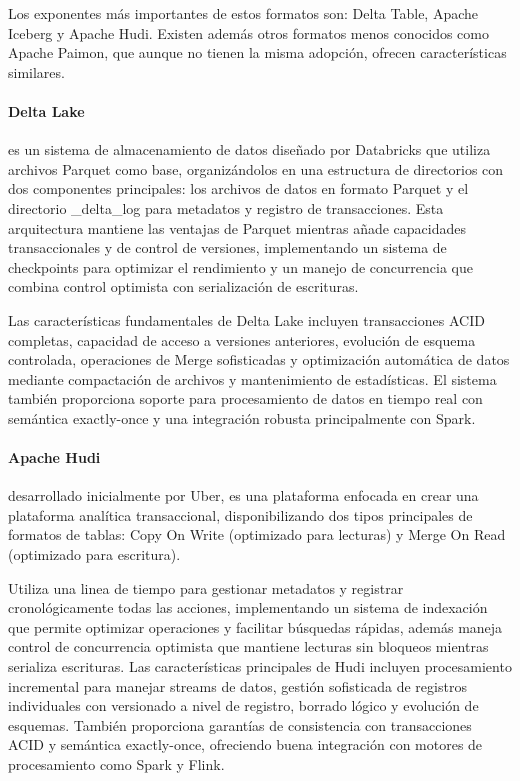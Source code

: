Los exponentes más importantes de estos formatos son: Delta Table, Apache Iceberg y Apache Hudi.
Existen además otros formatos menos conocidos como Apache Paimon,
que aunque no tienen la misma adopción, ofrecen características similares.

\paragraph{Delta Lake}es un sistema de almacenamiento de datos diseñado por Databricks que utiliza archivos Parquet como base, 
organizándolos en una estructura de directorios con dos componentes principales: 
los archivos de datos en formato Parquet y el directorio {\_delta\_log} para metadatos y registro de transacciones. 
Esta arquitectura mantiene las ventajas de Parquet mientras añade capacidades transaccionales y de control de versiones, 
implementando un sistema de checkpoints para optimizar el rendimiento y un manejo de concurrencia que combina control optimista 
con serialización de escrituras.

Las características fundamentales de Delta Lake incluyen transacciones ACID completas, 
capacidad de acceso a versiones anteriores, evolución de esquema controlada, 
operaciones de Merge sofisticadas y optimización automática de datos mediante compactación de archivos y mantenimiento de estadísticas. 
El sistema también proporciona soporte para procesamiento de datos en tiempo real con semántica exactly-once 
y una integración robusta principalmente con Spark.

\newpage
\paragraph{Apache Hudi}desarrollado inicialmente por Uber, es una plataforma enfocada en crear una plataforma analítica transaccional,
disponibilizando dos tipos principales de formatos de tablas: 
Copy On Write (optimizado para lecturas) y Merge On Read (optimizado para escritura). 

Utiliza una linea de tiempo para gestionar metadatos y registrar cronológicamente todas las acciones, 
implementando un sistema de indexación que permite optimizar operaciones y facilitar búsquedas rápidas, 
además maneja control de concurrencia optimista que mantiene lecturas sin bloqueos mientras serializa escrituras.
Las características principales de Hudi incluyen procesamiento incremental para manejar streams de datos, 
gestión sofisticada de registros individuales con versionado a nivel de registro, borrado lógico y evolución de esquemas.
También proporciona garantías de consistencia con transacciones ACID y semántica exactly-once, 
ofreciendo buena integración con motores de procesamiento como Spark y Flink.

